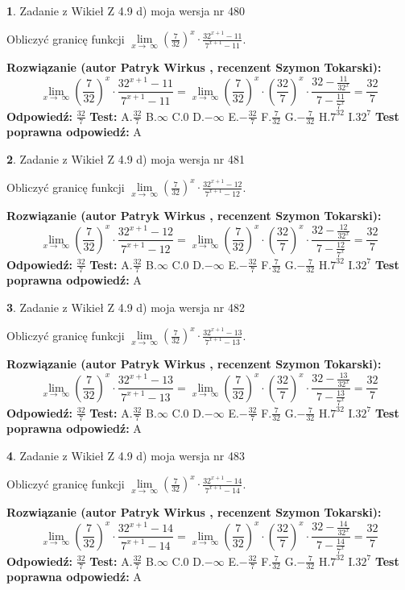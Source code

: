 \documentclass[12pt, a4paper]{article}
\theoremstyle{definition} %
\newtheorem{zad}{}
\newcommand{\zadStart}[1]{\begin{zad}#1\newline}
\newcommand{\zadStop}{\end{zad}}
\newcommand{\rozwStart}[2]{\noindent \textbf{Rozwiązanie (autor #1 , recenzent #2): }\newline}
\newcommand{\rozwStop}{\newline}
\newcommand{\odpStart}{\noindent \textbf{Odpowiedź:}\newline}
\newcommand{\odpStop}{\newline}
\newcommand{\testStart}{\noindent \textbf{Test:}\newline}
\newcommand{\testStop}{\newline}
\newcommand{\kluczStart}{\noindent \textbf{Test poprawna odpowiedź:}\newline}
\newcommand{\kluczStop}{\newline}
\begin{document}
\zadStart{Zadanie z Wikieł Z 4.9 d) moja wersja nr 480}


Obliczyć granicę funkcji  $\lim\limits_{x\to\ \infty}(\frac{7}{32})^{x}\cdot\frac{32^{x+1}-11}{7^{x+1}-11}$.
\zadStop
\rozwStart{Patryk Wirkus}{Szymon Tokarski}
$$\lim\limits_{x\to\ \infty}(\frac{7}{32})^{x}\cdot\frac{32^{x+1}-11}{7^{x+1}-11}=\lim\limits_{x\to\ \infty}(\frac{7}{32})^{x}\cdot(\frac{32}{7})^{x} \cdot \frac{32-\frac{11}{32^{x}}}{7-\frac{11}{7^{x}}} = \frac{32}{7}$$
\rozwStop
\odpStart
$\frac{32}{7}$
\odpStop
\testStart
A.$\frac{32}{7}$ B.$\infty$ C.$0$ D.$-\infty$ E.$-\frac{32}{7}$
F.$\frac{7}{32}$ G.$-\frac{7}{32}$
H.$7^{32}$
I.$32^{7}$
\testStop
\kluczStart
A
\kluczStop



\zadStart{Zadanie z Wikieł Z 4.9 d) moja wersja nr 481}


Obliczyć granicę funkcji  $\lim\limits_{x\to\ \infty}(\frac{7}{32})^{x}\cdot\frac{32^{x+1}-12}{7^{x+1}-12}$.
\zadStop
\rozwStart{Patryk Wirkus}{Szymon Tokarski}
$$\lim\limits_{x\to\ \infty}(\frac{7}{32})^{x}\cdot\frac{32^{x+1}-12}{7^{x+1}-12}=\lim\limits_{x\to\ \infty}(\frac{7}{32})^{x}\cdot(\frac{32}{7})^{x} \cdot \frac{32-\frac{12}{32^{x}}}{7-\frac{12}{7^{x}}} = \frac{32}{7}$$
\rozwStop
\odpStart
$\frac{32}{7}$
\odpStop
\testStart
A.$\frac{32}{7}$ B.$\infty$ C.$0$ D.$-\infty$ E.$-\frac{32}{7}$
F.$\frac{7}{32}$ G.$-\frac{7}{32}$
H.$7^{32}$
I.$32^{7}$
\testStop
\kluczStart
A
\kluczStop



\zadStart{Zadanie z Wikieł Z 4.9 d) moja wersja nr 482}


Obliczyć granicę funkcji  $\lim\limits_{x\to\ \infty}(\frac{7}{32})^{x}\cdot\frac{32^{x+1}-13}{7^{x+1}-13}$.
\zadStop
\rozwStart{Patryk Wirkus}{Szymon Tokarski}
$$\lim\limits_{x\to\ \infty}(\frac{7}{32})^{x}\cdot\frac{32^{x+1}-13}{7^{x+1}-13}=\lim\limits_{x\to\ \infty}(\frac{7}{32})^{x}\cdot(\frac{32}{7})^{x} \cdot \frac{32-\frac{13}{32^{x}}}{7-\frac{13}{7^{x}}} = \frac{32}{7}$$
\rozwStop
\odpStart
$\frac{32}{7}$
\odpStop
\testStart
A.$\frac{32}{7}$ B.$\infty$ C.$0$ D.$-\infty$ E.$-\frac{32}{7}$
F.$\frac{7}{32}$ G.$-\frac{7}{32}$
H.$7^{32}$
I.$32^{7}$
\testStop
\kluczStart
A
\kluczStop



\zadStart{Zadanie z Wikieł Z 4.9 d) moja wersja nr 483}


Obliczyć granicę funkcji  $\lim\limits_{x\to\ \infty}(\frac{7}{32})^{x}\cdot\frac{32^{x+1}-14}{7^{x+1}-14}$.
\zadStop
\rozwStart{Patryk Wirkus}{Szymon Tokarski}
$$\lim\limits_{x\to\ \infty}(\frac{7}{32})^{x}\cdot\frac{32^{x+1}-14}{7^{x+1}-14}=\lim\limits_{x\to\ \infty}(\frac{7}{32})^{x}\cdot(\frac{32}{7})^{x} \cdot \frac{32-\frac{14}{32^{x}}}{7-\frac{14}{7^{x}}} = \frac{32}{7}$$
\rozwStop
\odpStart
$\frac{32}{7}$
\odpStop
\testStart
A.$\frac{32}{7}$ B.$\infty$ C.$0$ D.$-\infty$ E.$-\frac{32}{7}$
F.$\frac{7}{32}$ G.$-\frac{7}{32}$
H.$7^{32}$
I.$32^{7}$
\testStop
\kluczStart
A
\kluczStop
\end{document}
